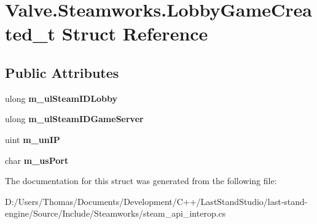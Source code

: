 \hypertarget{structValve_1_1Steamworks_1_1LobbyGameCreated__t}{}\section{Valve.\+Steamworks.\+Lobby\+Game\+Created\+\_\+t Struct Reference}
\label{structValve_1_1Steamworks_1_1LobbyGameCreated__t}
\subsection*{Public Attributes}
\begin{DoxyCompactItemize}
\item 
\hypertarget{structValve_1_1Steamworks_1_1LobbyGameCreated__t_aeb16d12746a47be408032bcc8a2821dd}{}ulong {\bfseries m\+\_\+ul\+Steam\+I\+D\+Lobby}\label{structValve_1_1Steamworks_1_1LobbyGameCreated__t_aeb16d12746a47be408032bcc8a2821dd}

\item 
\hypertarget{structValve_1_1Steamworks_1_1LobbyGameCreated__t_a9ac74e23cae5ce48fbe6cb49c7f44f3f}{}ulong {\bfseries m\+\_\+ul\+Steam\+I\+D\+Game\+Server}\label{structValve_1_1Steamworks_1_1LobbyGameCreated__t_a9ac74e23cae5ce48fbe6cb49c7f44f3f}

\item 
\hypertarget{structValve_1_1Steamworks_1_1LobbyGameCreated__t_a0f4d6618503ccad814de26c4d160865c}{}uint {\bfseries m\+\_\+un\+I\+P}\label{structValve_1_1Steamworks_1_1LobbyGameCreated__t_a0f4d6618503ccad814de26c4d160865c}

\item 
\hypertarget{structValve_1_1Steamworks_1_1LobbyGameCreated__t_a0135e5207d6e037a81ec1413bcd3c200}{}char {\bfseries m\+\_\+us\+Port}\label{structValve_1_1Steamworks_1_1LobbyGameCreated__t_a0135e5207d6e037a81ec1413bcd3c200}

\end{DoxyCompactItemize}


The documentation for this struct was generated from the following file\+:\begin{DoxyCompactItemize}
\item 
D\+:/\+Users/\+Thomas/\+Documents/\+Development/\+C++/\+Last\+Stand\+Studio/last-\/stand-\/engine/\+Source/\+Include/\+Steamworks/steam\+\_\+api\+\_\+interop.\+cs\end{DoxyCompactItemize}
